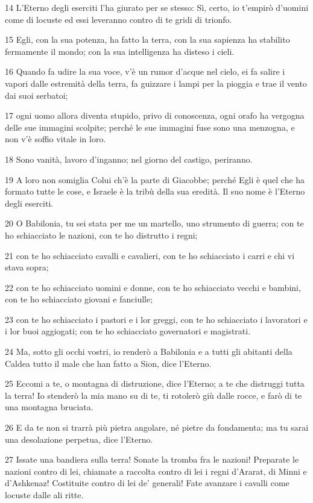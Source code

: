 \par 14 L'Eterno degli eserciti l'ha giurato per se stesso: Sì, certo, io t'empirò d'uomini come di locuste ed essi leveranno contro di te gridi di trionfo.
\par 15 Egli, con la sua potenza, ha fatto la terra, con la sua sapienza ha stabilito fermamente il mondo; con la sua intelligenza ha disteso i cieli.
\par 16 Quando fa udire la sua voce, v'è un rumor d'acque nel cielo, ei fa salire i vapori dalle estremità della terra, fa guizzare i lampi per la pioggia e trae il vento dai suoi serbatoi;
\par 17 ogni uomo allora diventa stupido, privo di conoscenza, ogni orafo ha vergogna delle sue immagini scolpite; perché le sue immagini fuse sono una menzogna, e non v'è soffio vitale in loro.
\par 18 Sono vanità, lavoro d'inganno; nel giorno del castigo, periranno.
\par 19 A loro non somiglia Colui ch'è la parte di Giacobbe; perché Egli è quel che ha formato tutte le cose, e Israele è la tribù della sua eredità. Il suo nome è l'Eterno degli eserciti.
\par 20 O Babilonia, tu sei stata per me un martello, uno strumento di guerra; con te ho schiacciato le nazioni, con te ho distrutto i regni;
\par 21 con te ho schiacciato cavalli e cavalieri, con te ho schiacciato i carri e chi vi stava sopra;
\par 22 con te ho schiacciato uomini e donne, con te ho schiacciato vecchi e bambini, con te ho schiacciato giovani e fanciulle;
\par 23 con te ho schiacciato i pastori e i lor greggi, con te ho schiacciato i lavoratori e i lor buoi aggiogati; con te ho schiacciato governatori e magistrati.
\par 24 Ma, sotto gli occhi vostri, io renderò a Babilonia e a tutti gli abitanti della Caldea tutto il male che han fatto a Sion, dice l'Eterno.
\par 25 Eccomi a te, o montagna di distruzione, dice l'Eterno; a te che distruggi tutta la terra! Io stenderò la mia mano su di te, ti rotolerò giù dalle rocce, e farò di te una montagna bruciata.
\par 26 E da te non si trarrà più pietra angolare, né pietre da fondamenta; ma tu sarai una desolazione perpetua, dice l'Eterno.
\par 27 Issate una bandiera sulla terra! Sonate la tromba fra le nazioni! Preparate le nazioni contro di lei, chiamate a raccolta contro di lei i regni d'Ararat, di Minni e d'Ashkenaz! Costituite contro di lei de' generali! Fate avanzare i cavalli come locuste dalle ali ritte.
